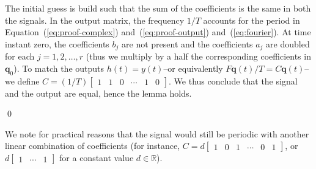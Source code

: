 \documentclass[letterpaper,10pt,conference]{ieeeconf}
\theoremstyle{definition}
\begin{document}
The initial guess is build such that the sum of the coefficients is the same in both the signals. In the output matrix, the frequency $1/T$ accounts for the period in Equation~(\ref{eq:proof-complex}) and~(\ref{eq:proof-output}) and~(\ref{eq:fourier}). At time instant zero, the coefficients $b_j$ are not present and the coefficients $a_j$ are doubled for each $j=1,2,\dots,r$ (thus we multiply by a half the corresponding coefficients in $\mathbf{q}_0$). To match the outputs $h(t)=y(t)$--or equivalently $F\mathbf{q}(t)/T=C\mathbf{q}(t)$--we define $C=(1/T)\begin{bmatrix}1 & 1 & 0 & \cdots & 1 & 0\end{bmatrix}$. We thus conclude that the signal and the output are equal, hence the lemma holds.

\qed

We note for practical reasons that the signal would still be periodic with another linear combination of coefficients (for instance, $C=d\begin{bmatrix}1 & 0 & 1 & \cdots & 0 & 1\end{bmatrix}$, or $d\begin{bmatrix}1 & \cdots & 1\end{bmatrix}$ for a constant value $d\in\mathbb{R}$).
\end{document}
